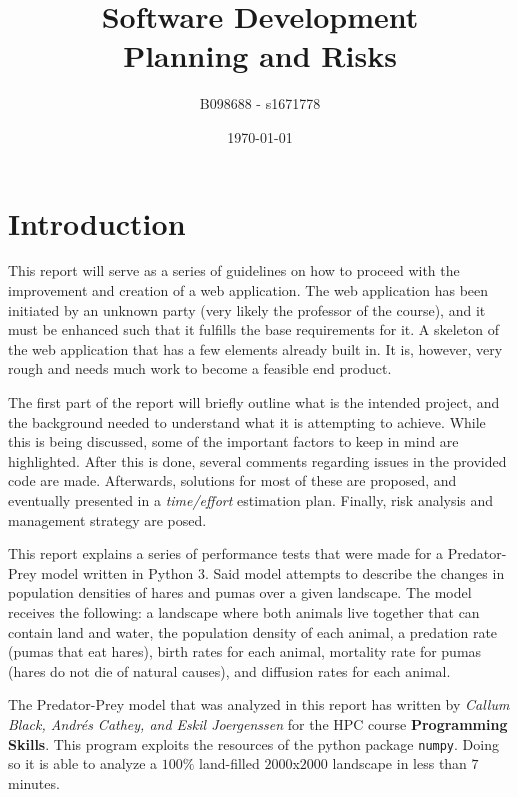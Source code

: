 \documentclass[12pt,a4paper]{article}
\begin{document}
\title{Software Development\\Planning and Risks}
\author{B098688 - s1671778}
\date{\today}

\makeEPCCtitle

\thispagestyle{empty}

\newpage


\tableofcontents


\newpage
{}

\section{Introduction}

This report will serve as a series of guidelines on how to proceed with the improvement and creation of a web application. The web application has been initiated by an unknown party (very likely the professor of the course), and it must be enhanced such that it fulfills the base requirements for it. A skeleton of the web application that has a few elements already built in. It is, however, very rough and needs much work to become a feasible end product. 

The first part of the report will briefly outline what is the intended project, and the background needed to understand what it is attempting to achieve. While this is being discussed, some of the important factors to keep in mind are highlighted. After this is done, several comments regarding issues in the provided code are made. Afterwards, solutions for most of these are proposed, and eventually presented in a \textit{time/effort} estimation plan. Finally, risk analysis and management strategy are posed.  








This report explains a series of performance tests that were made for a 
Predator-Prey model written in Python 3. Said model attempts to describe the 
changes in population densities of hares and pumas over a given landscape. The 
model receives the 
following: a landscape where both animals live together that can contain land 
and water, the population density of each animal, a predation rate (pumas that 
eat hares), birth rates for each animal, mortality rate for pumas (hares do not 
die of natural causes), and diffusion rates for each animal. 

The Predator-Prey model that was analyzed in this report has written by 
\textit{Callum Black, Andr\'es Cathey, and Eskil Joergenssen} for the HPC 
course \textbf{Programming Skills}. This program exploits the resources of the 
python package \texttt{numpy}. Doing so it is able to analyze a $100\%$ 
land-filled 
$2000$x$2000$ landscape in less than $7$ minutes. 
\end{document}
